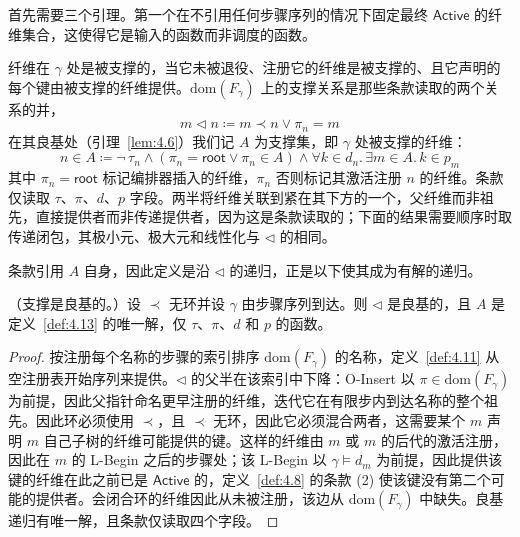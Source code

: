首先需要三个引理。第一个在不引用任何步骤序列的情况下固定最终 $\mathsf{Active}$ 的纤维集合，这使得它是输入的函数而非调度的函数。

\begin{definition}\label{def:4.15}
纤维在 $\gamma$ 处是被支撑的，当它未被退役、注册它的纤维是被支撑的、且它声明的每个键由被支撑的纤维提供。$\mathrm{dom}(F_\gamma)$ 上的支撑关系是那些条款读取的两个关系的并，
\begin{equation}\label{eq:4.31}
m \triangleleft n \coloneqq m \prec n \lor \pi_n = m
\end{equation}
在其良基处（引理~\ref{lem:4.6}）我们记 $A$ 为支撑集，即 $\gamma$ 处被支撑的纤维：
\begin{equation}\label{eq:4.32}
n \in A \coloneqq \lnot\,\tau_n \land (\pi_n = \mathsf{root} \lor \pi_n \in A) \land \forall k \in d_n.\, \exists m \in A.\, k \in p_m
\end{equation}
其中 $\pi_n = \mathsf{root}$ 标记编排器插入的纤维，$\pi_n$ 否则标记其激活注册 $n$ 的纤维。条款仅读取 $\tau$、$\pi$、$d$、$p$ 字段。两半将纤维关联到紧在其下方的一个，父纤维而非祖先，直接提供者而非传递提供者，因为这是条款读取的；下面的结果需要顺序时取传递闭包，其极小元、极大元和线性化与 $\triangleleft$ 的相同。
\end{definition}

条款引用 $A$ 自身，因此定义是沿 $\triangleleft$ 的递归，正是以下使其成为有解的递归。

\begin{lemma}\label{lem:4.6}
（支撑是良基的。）设 $\prec$ 无环并设 $\gamma$ 由步骤序列到达。则 $\triangleleft$ 是良基的，且 $A$ 是定义~\ref{def:4.13} 的唯一解，仅 $\tau$、$\pi$、$d$ 和 $p$ 的函数。
\end{lemma}

\begin{proof}
按注册每个名称的步骤的索引排序 $\mathrm{dom}(F_\gamma)$ 的名称，定义~\ref{def:4.11} 从空注册表开始序列来提供。$\triangleleft$ 的父半在该索引中下降：O-Insert 以 $\pi \in \mathrm{dom}(F_\gamma)$ 为前提，因此父指针命名更早注册的纤维，迭代它在有限步内到达名称的整个祖先。因此环必须使用 $\prec$，且 $\prec$ 无环，因此它必须混合两者，这需要某个 $m$ 声明 $m$ 自己子树的纤维可能提供的键。这样的纤维由 $m$ 或 $m$ 的后代的激活注册，因此在 $m$ 的 L-Begin 之后的步骤处；该 L-Begin 以 $\gamma \models d_m$ 为前提，因此提供该键的纤维在此之前已是 $\mathsf{Active}$ 的，定义~\ref{def:4.8} 的条款 (2) 使该键没有第二个可能的提供者。会闭合环的纤维因此从未被注册，该边从 $\mathrm{dom}(F_\gamma)$ 中缺失。良基递归有唯一解，且条款仅读取四个字段。
\end{proof}

